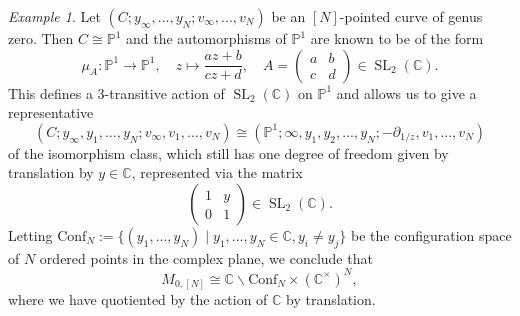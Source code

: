 \documentclass[11pt]{report}
\theoremstyle{definition}
\theoremstyle{remark}
\theoremstyle{remark}
\newtheorem*{example}{Example}
\newcommand{\C}{\mathbb{C}}
\renewcommand{\P}{\mathbb{P}}
\begin{document}
\begin{example}
Let $(C;y_\infty,...,y_N;v_\infty,...,v_N)$ be an $[N]$-pointed curve of genus zero. Then $C \cong \P^1$ and the automorphisms of $\P^1$ are known to be of the form
\begin{equation*}
\mu_A: \P^1 \to \P^1, \quad z \mapsto \frac{az+b}{cz+d}, \quad
A =
\begin{pmatrix}
a & b \\ c & d
\end{pmatrix}
\in \operatorname{SL}_2(\C).
\end{equation*}
This defines a 3-transitive action of $\operatorname{SL}_2(\C)$ on $\P^1$ and allows us to give a representative
\begin{equation*}
(C;y_\infty,y_1,...,y_N;v_\infty,v_1,...,v_N) \cong (\P^1;\infty,y_1,y_2,...,y_N;-\partial_{1/z},v_1,...,v_N)
\end{equation*}
of the isomorphism class, which still has one degree of freedom given by translation by $y \in \C$, represented via the matrix
\begin{equation*}
\begin{pmatrix}
1 & y \\ 0 & 1
\end{pmatrix}
\in \operatorname{SL}_2(\C).
\end{equation*}
Letting $\text{Conf}_N := \{ (y_1,...,y_N) \mid y_1,...,y_N \in \C, y_i \neq y_j \}$ be the configuration space of $N$ ordered points in the complex plane, we conclude that
\begin{equation*}
M_{0,[N]} \cong \C \backslash \text{Conf}_N \times (\C^\times)^N,
\end{equation*}
where we have quotiented by the action of $\C$ by translation.
\end{example}
\end{document}
